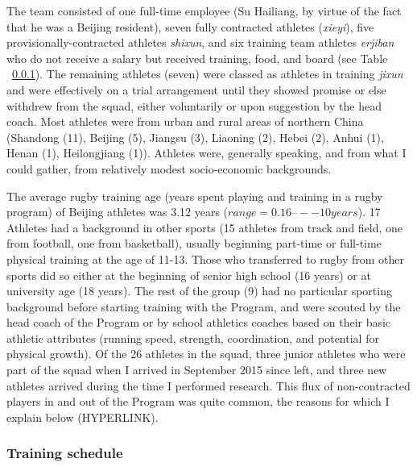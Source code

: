 \begin{CJK}{UTF8}{gbsn}
  

  The team consisted of one full-time employee (Su Hailiang, by virtue of the fact that he was a Beijing resident), seven fully contracted athletes (\textit{xieyi}), five provisionally-contracted athletes \textit{shixun}, and six training team athletes \textit{erjiban} who do not receive a salary but received training, food, and board (see Table ~\ref{}).  The remaining athletes (seven) were classed as athletes in training \textit{jixun} and were effectively on a trial arrangement until they showed promise or else withdrew from the squad, either voluntarily or upon suggestion by the head coach.  Most athletes were from urban and rural areas of northern China (Shandong (11), Beijing (5), Jiangsu (3), Liaoning (2), Hebei (2), Anhui (1), Henan (1), Heilongjiang (1)). Athletes were, generally speaking, and from what I could gather, from relatively modest socio-economic backgrounds.

  The average rugby training age (years spent playing and training in a rugby program) of Beijing athletes was 3.12 years ($range = 0.16 –-- 10 years$).  17 Athletes had a background in other sports (15 athletes from track and field, one from football, one from basketball), usually beginning part-time or full-time physical training at the age of 11-13.  Those who transferred to rugby from other sports did so either at the beginning of senior high school (16 years) or at university age (18 years).  The rest of the group (9) had no particular sporting background before starting training with the Program, and were scouted by the head coach of the Program or by school athletics coaches based on their basic athletic attributes (running speed, strength, coordination, and potential for physical growth).  Of the 26 athletes in the squad, three junior athletes who were part of the squad when I arrived in September 2015 since left, and three new athletes arrived during the time I performed research. This flux of non-contracted players in and out of the Program was quite common, the reasons for which I explain below (HYPERLINK).



  \subsubsection{Training schedule}


\end{CJK}
